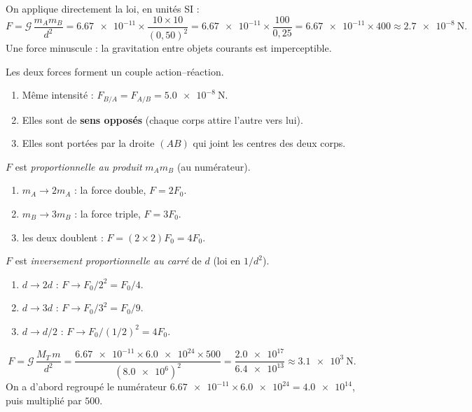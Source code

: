\documentclass[11pt,a4paper]{article}
\begin{document}

\begin{corrige}
On applique directement la loi, en unités SI :
\[
F=\mathcal{G}\,\frac{m_A m_B}{d^2}
 =\num{6.67e-11}\times\frac{10\times 10}{(0{,}50)^2}
 =\num{6.67e-11}\times\frac{100}{0{,}25}
 =\num{6.67e-11}\times 400\approx\qty{2.7e-8}{\newton}.
\]
Une force minuscule : la gravitation entre objets courants est imperceptible.
\end{corrige}

\begin{corrige}
Les deux forces forment un couple action--réaction.
\begin{enumerate}[label=\alph*)]
  \item Même intensité : $F_{B/A}=F_{A/B}=\qty{5.0e-8}{\newton}$.
  \item Elles sont de \textbf{sens opposés} (chaque corps attire l'autre vers lui).
  \item Elles sont portées par la droite $(AB)$ qui joint les centres des deux corps.
\end{enumerate}
\end{corrige}

\begin{corrige}
$F$ est \emph{proportionnelle au produit} $m_A m_B$ (au numérateur).
\begin{enumerate}[label=\alph*)]
  \item $m_A\to 2m_A$ : la force double, $F=2F_0$.
  \item $m_B\to 3m_B$ : la force triple, $F=3F_0$.
  \item les deux doublent : $F=(2\times 2)F_0=4F_0$.
\end{enumerate}
\end{corrige}

\begin{corrige}
$F$ est \emph{inversement proportionnelle au carré} de $d$ (loi en $1/d^2$).
\begin{enumerate}[label=\alph*)]
  \item $d\to 2d$ : $F\to F_0/2^2=F_0/4$.
  \item $d\to 3d$ : $F\to F_0/3^2=F_0/9$.
  \item $d\to d/2$ : $F\to F_0/(1/2)^2=4F_0$.
\end{enumerate}
\end{corrige}

\begin{corrige}
\[
F=\mathcal{G}\,\frac{M_T\,m}{d^2}
 =\frac{\num{6.67e-11}\times\num{6.0e24}\times 500}{(\num{8.0e6})^2}
 =\frac{\num{2.0e17}}{\num{6.4e13}}\approx\qty{3.1e3}{\newton}.
\]
On a d'abord regroupé le numérateur $\num{6.67e-11}\times\num{6.0e24}=\num{4.0e14}$,
puis multiplié par $500$.
\end{corrige}
\end{document}
